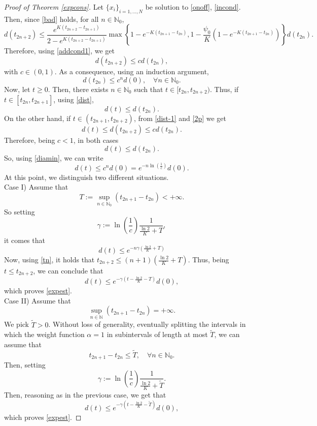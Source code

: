 \documentclass[a4paper,11pt,oneside]{article}
\begin{document}
		\begin{proof}[Proof of Theorem \ref{expcons}]
			Let $\{x_{i}\}_{i=1,\dots,N}$ be solution to \eqref{onoff}, \eqref{incond}. Then, since \eqref{bad} holds, for all $n\in \mathbb{N}_{0}$, 	$$d(t_{2n+2})\leq \frac{e^{K(t_{2n+2}-t_{2n+1})}}{2-e^{K(t_{2n+2}-t_{2n+1})}}\max\left\{1-e^{-K(t_{2n+1}-t_{2n})},1-\frac{\psi_{0}}{K}(1-e^{-K(t_{2n+1}-t_{2n})})\right\}d(t_{2n}).$$
			Therefore, using \eqref{addcond1}, we get \begin{equation}\label{2p}
				d(t_{2n+2})\leq cd(t_{2n}),
			\end{equation}
			with $c\in (0,1)$. As a consequence, using an induction argument,
			\begin{equation}\label{diamin}
				d(t_{2n})\leq c^{n}d(0),\quad \forall n\in \mathbb{N}_{0}.
			\end{equation}
			Now, let $t\geq 0$. Then, there exists $n\in \mathbb{N}_{0}$ such that $t\in [t_{2n},t_{2n+2})$. Thus, if $t\in [t_{2n},t_{2n+1}]$, using \eqref{dist}, 
			$$d(t)\leq d(t_{2n}).$$
			On the other hand, if $t\in (t_{2n+1},t_{2n+2})$, from \eqref{dist-1} and \eqref{2p} we get
			$$d(t)\leq d(t_{2n+2})\leq cd(t_{2n}).$$
			Therefore, being $c<1$, in both cases
			$$d(t)\leq d(t_{2n}).$$
			So, using \eqref{diamin}, we can write
			$$d(t)\leq c^{n}d(0)=e^{-n\ln \left(\frac{1}{c}\right)}d(0).$$
			At this point, we distinguish two different situations. 
			\\Case I) Assume that $$T:=\sup_{n\in \mathbb{N}_0}(t_{2n+1}-t_{2n})<+\infty.$$
			So setting 
			$$\gamma:=\ln \left(\frac{1}{c}\right)\frac{1}{\frac{\ln2}{K}+T},$$
			it comes that $$d(t)\leq e^{-n\gamma\left(\frac{\ln2}{K}+T\right)}$$
			Now, using \eqref{tn}, it holds that $t_{2n+2}\leq (n+1)\left(\frac{\ln2}{K}+T\right)$. Thus, being $t\leq t_{2n+2}$, we can conclude that $$d(t)\leq e^{-\gamma\left(t-\frac{\ln2}{K}-T\right)}d(0),$$
			which proves \eqref{expest}.
			\\Case II) Assume that $$\sup_{n\in \mathbb{N}}(t_{2n+1}-t_{2n})=+\infty.$$
			We pick $\tilde{T}>0$. Without loss of generality, eventually splitting the intervals in which the weight function $\alpha=1$ in subintervals of length at most $\tilde{T}$, we can assume that
			\begin{equation}\label{T}
				t_{2n+1}-t_{2n}\leq \tilde{T},\quad \forall n\in \mathbb{N}_0.
			\end{equation}
		Then, setting $$\gamma:=\ln\left(\frac{1}{c}\right)\frac{1}{\frac{\ln2}{K}+\tilde{T}}.$$
		Then, reasoning as in the previous case, we get that $$d(t)\leq e^{-\gamma\left(t-\frac{\ln2}{K}-\tilde{T}\right)}d(0),$$
		which proves \eqref{expest}.
		\end{proof}
\end{document}
